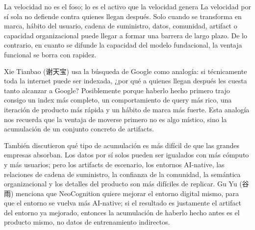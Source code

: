 \documentclass[a4paper]{article}
\begin{document}
\begin{importantbox}{La velocidad no es el foso; lo es el activo que la velocidad genera}
La velocidad por sí sola no defiende contra quienes llegan después. Solo cuando se transforma en marca, hábito del usuario, cadena de suministro, datos, comunidad, artifact o capacidad organizacional puede llegar a formar una barrera de largo plazo. De lo contrario, en cuanto se difunde la capacidad del modelo fundacional, la ventaja funcional se borra con rapidez.
\end{importantbox}

Xie Tianbao (谢天宝) usa la búsqueda de Google como analogía: si técnicamente toda la internet puede ser indexada, ¿por qué a quienes llegan después les cuesta tanto alcanzar a Google? Posiblemente porque haberlo hecho primero trajo consigo un index más completo, un comportamiento de query más rico, una iteración de producto más rápida y un hábito de marca más fuerte. Esta analogía nos recuerda que la ventaja de moverse primero no es algo místico, sino la acumulación de un conjunto concreto de artifacts.

También discutieron qué tipo de acumulación es más difícil de que las grandes empresas absorban. Los datos por sí solos pueden ser igualados con más cómputo y más usuarios; pero los artifacts de escenario, los entornos AI-native, las relaciones de cadena de suministro, la confianza de la comunidad, la semántica organizacional y los detalles del producto son más difíciles de replicar. Gu Yu (谷雨) menciona que NeoCognition quiere mejorar el entorno digital mismo, para que el entorno se vuelva más AI-native; si el resultado es justamente el artifact del entorno ya mejorado, entonces la acumulación de haberlo hecho antes es el producto mismo, no datos de entrenamiento indirectos.
\end{document}
